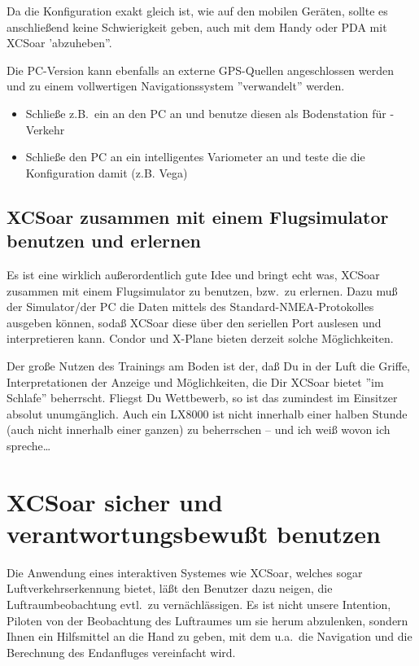 Da die Konfiguration exakt gleich ist, wie auf den mobilen Geräten, sollte es anschließend keine Schwierigkeit geben,
auch mit dem Handy oder PDA mit \textsf{XCSoar} 'abzuheben''.


Die PC-Version kann ebenfalls an externe GPS-Quellen angeschlossen werden und zu einem 
vollwertigen Navigationssystem ''verwandelt'' werden. 


\begin{itemize}
\item Schließe z.B.\ ein \fl an den PC an und benutze diesen als Bodenstation für \fl-Verkehr
\item Schließe den PC an ein intelligentes Variometer an und teste die die Konfiguration damit  (z.B. Vega)
\end{itemize}

\subsection*{\textsf{XCSoar} zusammen mit einem Flugsimulator benutzen und erlernen}
Es ist eine wirklich außerordentlich gute Idee und bringt echt was, \textsf{XCSoar} zusammen mit einem Flugsimulator zu benutzen, bzw.\ zu erlernen.
Dazu muß der Simulator/der PC die Daten mittels des Standard-NMEA-Protokolles ausgeben können, sodaß  \textsf{XCSoar} diese über den seriellen Port auslesen und interpretieren kann.
{\sc Condor} und {\sc X-Plane} bieten derzeit solche Möglichkeiten.  

Der große Nutzen des Trainings am Boden ist der, daß Du in der Luft die Griffe, Interpretationen der Anzeige und Möglichkeiten, 
die Dir \textsf{XCSoar} bietet ''im Schlafe'' beherrscht. Fliegst Du Wettbewerb, so ist das zumindest im Einsitzer absolut unumgänglich.
Auch ein LX8000 ist nicht innerhalb einer halben Stunde (auch nicht innerhalb einer ganzen) zu beherrschen -- und ich weiß wovon ich spreche\dots


\section{\textsf{XCSoar} sicher und verantwortungsbewußt benutzen}
Die Anwendung eines interaktiven Systemes wie  \textsf{XCSoar}, welches sogar Luftverkehrserkennung bietet, läßt den Benutzer dazu neigen, die Luftraumbeobachtung evtl.\ zu vernächlässigen. 
Es ist nicht unsere Intention, Piloten von der Beobachtung des Luftraumes um sie herum abzulenken,  sondern Ihnen  ein Hilfsmittel an die Hand zu geben,
mit dem u.a.\ die Navigation  und die Berechnung  des Endanfluges vereinfacht wird.

